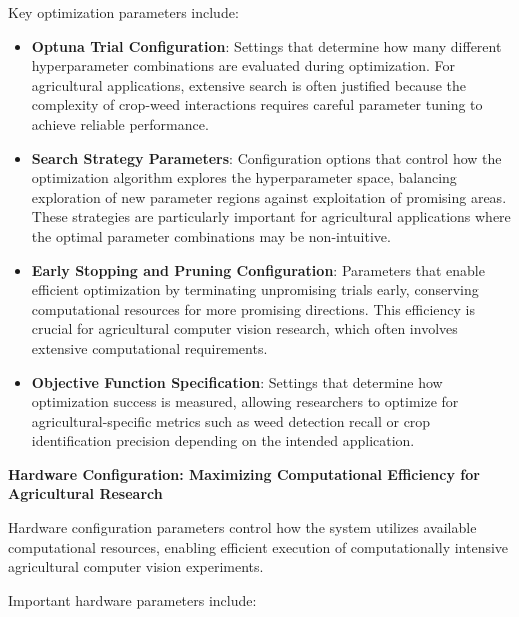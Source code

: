 Key optimization parameters include:

\begin{itemize}
    \item \textbf{Optuna Trial Configuration}: Settings that determine how many different hyperparameter combinations are evaluated during optimization. For agricultural applications, extensive search is often justified because the complexity of crop-weed interactions requires careful parameter tuning to achieve reliable performance.
    
    \item \textbf{Search Strategy Parameters}: Configuration options that control how the optimization algorithm explores the hyperparameter space, balancing exploration of new parameter regions against exploitation of promising areas. These strategies are particularly important for agricultural applications where the optimal parameter combinations may be non-intuitive.
    
    \item \textbf{Early Stopping and Pruning Configuration}: Parameters that enable efficient optimization by terminating unpromising trials early, conserving computational resources for more promising directions. This efficiency is crucial for agricultural computer vision research, which often involves extensive computational requirements.
    
    \item \textbf{Objective Function Specification}: Settings that determine how optimization success is measured, allowing researchers to optimize for agricultural-specific metrics such as weed detection recall or crop identification precision depending on the intended application.
\end{itemize}

\textbf{Hardware Configuration: Maximizing Computational Efficiency for Agricultural Research}

Hardware configuration parameters control how the system utilizes available computational resources, enabling efficient execution of computationally intensive agricultural computer vision experiments.

Important hardware parameters include:

